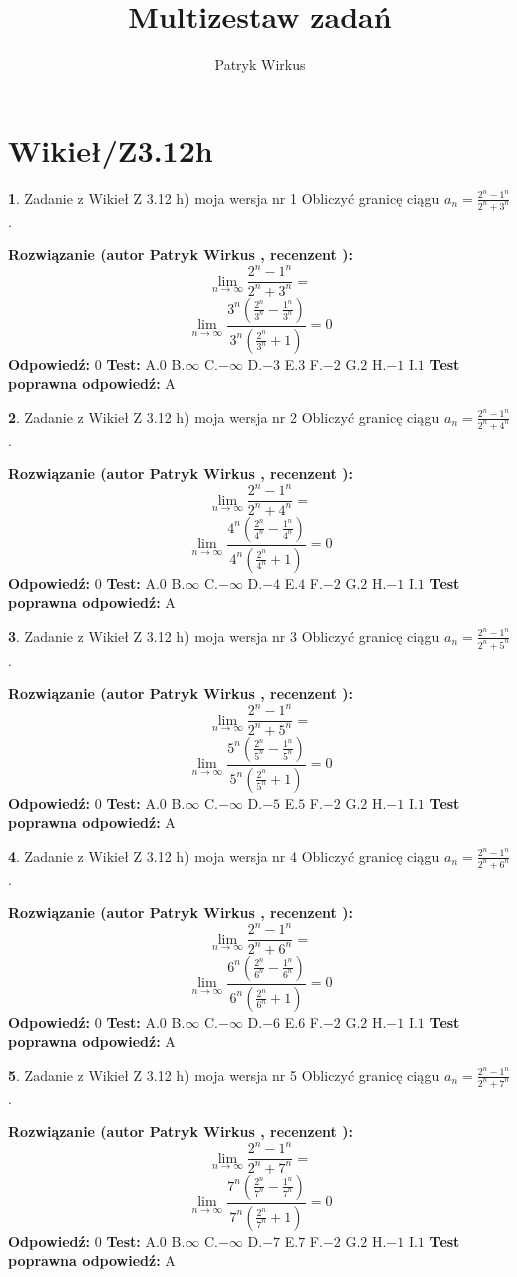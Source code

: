 \documentclass[12pt, a4paper]{article}
\title{Multizestaw zadań}
\author{Patryk Wirkus}
\date{}
\theoremstyle{definition} %
\newtheorem{zad}{}
\newcommand{\kategoria}[1]{\section{#1}}
\newcommand{\zadStart}[1]{\begin{zad}#1\newline}
\newcommand{\zadStop}{\end{zad}}
\newcommand{\rozwStart}[2]{\noindent \textbf{Rozwiązanie (autor #1 , recenzent #2): }\newline}
\newcommand{\rozwStop}{\newline}
\newcommand{\odpStart}{\noindent \textbf{Odpowiedź:}\newline}
\newcommand{\odpStop}{\newline}
\newcommand{\testStart}{\noindent \textbf{Test:}\newline}
\newcommand{\testStop}{\newline}
\newcommand{\kluczStart}{\noindent \textbf{Test poprawna odpowiedź:}\newline}
\newcommand{\kluczStop}{\newline}
\begin{document}
\maketitle

\kategoria{Wikieł/Z3.12h}


\zadStart{Zadanie z Wikieł Z 3.12 h) moja wersja nr 1}
Obliczyć granicę ciągu $a_{n}=\frac{2^{n} - 1^{n}}{2^{n} + 3^{n}}$.
\zadStop
\rozwStart{Patryk Wirkus}{}
$$\lim\limits_{n\to\infty}\frac{2^{n} - 1^{n}}{2^{n} + 3^{n}}=$$
$$\lim\limits_{n\to\infty}\frac{3^{n}(\frac{2^{n}}{3^{n}} - \frac{1^{n}}{3^{n}})}{3^{n}(\frac{2^{n}}{3^{n}} + 1)} = 0$$
\rozwStop
\odpStart
$0$
\odpStop
\testStart
A.$0$
B.$\infty$
C.$-\infty$
D.$-3$
E.$3$
F.$-2$
G.$2$
H.$-1$
I.$1$
\testStop
\kluczStart
A
\kluczStop



\zadStart{Zadanie z Wikieł Z 3.12 h) moja wersja nr 2}
Obliczyć granicę ciągu $a_{n}=\frac{2^{n} - 1^{n}}{2^{n} + 4^{n}}$.
\zadStop
\rozwStart{Patryk Wirkus}{}
$$\lim\limits_{n\to\infty}\frac{2^{n} - 1^{n}}{2^{n} + 4^{n}}=$$
$$\lim\limits_{n\to\infty}\frac{4^{n}(\frac{2^{n}}{4^{n}} - \frac{1^{n}}{4^{n}})}{4^{n}(\frac{2^{n}}{4^{n}} + 1)} = 0$$
\rozwStop
\odpStart
$0$
\odpStop
\testStart
A.$0$
B.$\infty$
C.$-\infty$
D.$-4$
E.$4$
F.$-2$
G.$2$
H.$-1$
I.$1$
\testStop
\kluczStart
A
\kluczStop



\zadStart{Zadanie z Wikieł Z 3.12 h) moja wersja nr 3}
Obliczyć granicę ciągu $a_{n}=\frac{2^{n} - 1^{n}}{2^{n} + 5^{n}}$.
\zadStop
\rozwStart{Patryk Wirkus}{}
$$\lim\limits_{n\to\infty}\frac{2^{n} - 1^{n}}{2^{n} + 5^{n}}=$$
$$\lim\limits_{n\to\infty}\frac{5^{n}(\frac{2^{n}}{5^{n}} - \frac{1^{n}}{5^{n}})}{5^{n}(\frac{2^{n}}{5^{n}} + 1)} = 0$$
\rozwStop
\odpStart
$0$
\odpStop
\testStart
A.$0$
B.$\infty$
C.$-\infty$
D.$-5$
E.$5$
F.$-2$
G.$2$
H.$-1$
I.$1$
\testStop
\kluczStart
A
\kluczStop



\zadStart{Zadanie z Wikieł Z 3.12 h) moja wersja nr 4}
Obliczyć granicę ciągu $a_{n}=\frac{2^{n} - 1^{n}}{2^{n} + 6^{n}}$.
\zadStop
\rozwStart{Patryk Wirkus}{}
$$\lim\limits_{n\to\infty}\frac{2^{n} - 1^{n}}{2^{n} + 6^{n}}=$$
$$\lim\limits_{n\to\infty}\frac{6^{n}(\frac{2^{n}}{6^{n}} - \frac{1^{n}}{6^{n}})}{6^{n}(\frac{2^{n}}{6^{n}} + 1)} = 0$$
\rozwStop
\odpStart
$0$
\odpStop
\testStart
A.$0$
B.$\infty$
C.$-\infty$
D.$-6$
E.$6$
F.$-2$
G.$2$
H.$-1$
I.$1$
\testStop
\kluczStart
A
\kluczStop



\zadStart{Zadanie z Wikieł Z 3.12 h) moja wersja nr 5}
Obliczyć granicę ciągu $a_{n}=\frac{2^{n} - 1^{n}}{2^{n} + 7^{n}}$.
\zadStop
\rozwStart{Patryk Wirkus}{}
$$\lim\limits_{n\to\infty}\frac{2^{n} - 1^{n}}{2^{n} + 7^{n}}=$$
$$\lim\limits_{n\to\infty}\frac{7^{n}(\frac{2^{n}}{7^{n}} - \frac{1^{n}}{7^{n}})}{7^{n}(\frac{2^{n}}{7^{n}} + 1)} = 0$$
\rozwStop
\odpStart
$0$
\odpStop
\testStart
A.$0$
B.$\infty$
C.$-\infty$
D.$-7$
E.$7$
F.$-2$
G.$2$
H.$-1$
I.$1$
\testStop
\kluczStart
A
\kluczStop
\end{document}
